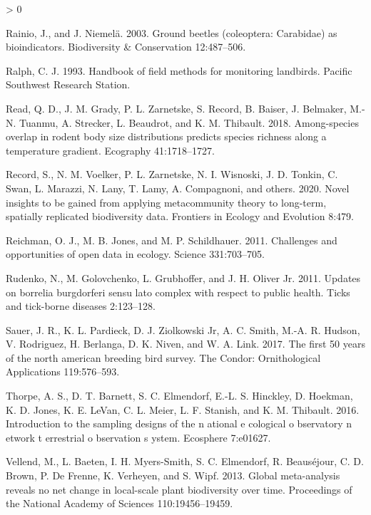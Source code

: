 \documentclass[
  12pt,
]{article}
\newlength{\cslhangindent}
\newenvironment{CSLReferences}[2] %
 {%
  \setlength{\parindent}{0pt}
  \ifodd #1 \everypar{\setlength{\hangindent}{\cslhangindent}}\ignorespaces\fi
  \ifnum #2 > 0
  \setlength{\parskip}{#2\baselineskip}
  \fi
 }%
 {}
\begin{document}
\begin{CSLReferences}{1}{0}
\leavevmode\hypertarget{ref-rainio2003ground}{}%
Rainio, J., and J. Niemelä. 2003. Ground beetles (coleoptera: Carabidae) as bioindicators. Biodiversity \& Conservation 12:487--506.

\leavevmode\hypertarget{ref-ralph1993handbook}{}%
Ralph, C. J. 1993. Handbook of field methods for monitoring landbirds. Pacific Southwest Research Station.

\leavevmode\hypertarget{ref-read2018among}{}%
Read, Q. D., J. M. Grady, P. L. Zarnetske, S. Record, B. Baiser, J. Belmaker, M.-N. Tuanmu, A. Strecker, L. Beaudrot, and K. M. Thibault. 2018. Among-species overlap in rodent body size distributions predicts species richness along a temperature gradient. Ecography 41:1718--1727.

\leavevmode\hypertarget{ref-record2020novel}{}%
Record, S., N. M. Voelker, P. L. Zarnetske, N. I. Wisnoski, J. D. Tonkin, C. Swan, L. Marazzi, N. Lany, T. Lamy, A. Compagnoni, and others. 2020. Novel insights to be gained from applying metacommunity theory to long-term, spatially replicated biodiversity data. Frontiers in Ecology and Evolution 8:479.

\leavevmode\hypertarget{ref-reichman2011challenges}{}%
Reichman, O. J., M. B. Jones, and M. P. Schildhauer. 2011. Challenges and opportunities of open data in ecology. Science 331:703--705.

\leavevmode\hypertarget{ref-rudenko2011updates}{}%
Rudenko, N., M. Golovchenko, L. Grubhoffer, and J. H. Oliver Jr. 2011. Updates on borrelia burgdorferi sensu lato complex with respect to public health. Ticks and tick-borne diseases 2:123--128.

\leavevmode\hypertarget{ref-sauer2017first}{}%
Sauer, J. R., K. L. Pardieck, D. J. Ziolkowski Jr, A. C. Smith, M.-A. R. Hudson, V. Rodriguez, H. Berlanga, D. K. Niven, and W. A. Link. 2017. The first 50 years of the north american breeding bird survey. The Condor: Ornithological Applications 119:576--593.

\leavevmode\hypertarget{ref-thorpe2016introduction}{}%
Thorpe, A. S., D. T. Barnett, S. C. Elmendorf, E.-L. S. Hinckley, D. Hoekman, K. D. Jones, K. E. LeVan, C. L. Meier, L. F. Stanish, and K. M. Thibault. 2016. Introduction to the sampling designs of the n ational e cological o bservatory n etwork t errestrial o bservation s ystem. Ecosphere 7:e01627.

\leavevmode\hypertarget{ref-vellend2013global}{}%
Vellend, M., L. Baeten, I. H. Myers-Smith, S. C. Elmendorf, R. Beauséjour, C. D. Brown, P. De Frenne, K. Verheyen, and S. Wipf. 2013. Global meta-analysis reveals no net change in local-scale plant biodiversity over time. Proceedings of the National Academy of Sciences 110:19456--19459.


\end{CSLReferences}
\end{document}
